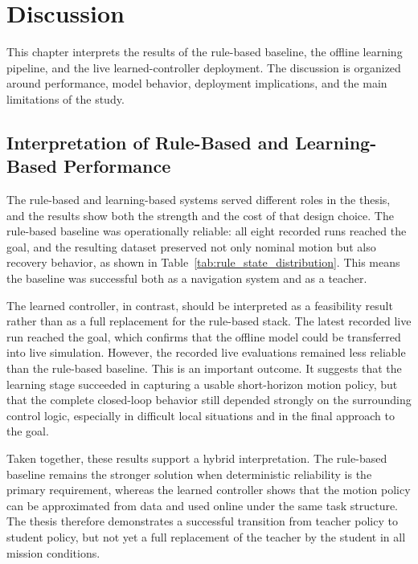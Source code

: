 
\chapter{Discussion}
\label{ch:discussion}

This chapter interprets the results of the rule-based baseline, the offline learning pipeline, and the live learned-controller deployment. The discussion is organized around performance, model behavior, deployment implications, and the main limitations of the study.

\section{Interpretation of Rule-Based and Learning-Based Performance}

The rule-based and learning-based systems served different roles in the thesis, and the results show both the strength and the cost of that design choice. The rule-based baseline was operationally reliable: all eight recorded runs reached the goal, and the resulting dataset preserved not only nominal motion but also recovery behavior, as shown in Table~\ref{tab:rule_state_distribution}. This means the baseline was successful both as a navigation system and as a teacher.

The learned controller, in contrast, should be interpreted as a feasibility result rather than as a full replacement for the rule-based stack. The latest recorded live run reached the goal, which confirms that the offline model could be transferred into live simulation. However, the recorded live evaluations remained less reliable than the rule-based baseline. This is an important outcome. It suggests that the learning stage succeeded in capturing a usable short-horizon motion policy, but that the complete closed-loop behavior still depended strongly on the surrounding control logic, especially in difficult local situations and in the final approach to the goal.

Taken together, these results support a hybrid interpretation. The rule-based baseline remains the stronger solution when deterministic reliability is the primary requirement, whereas the learned controller shows that the motion policy can be approximated from data and used online under the same task structure. The thesis therefore demonstrates a successful transition from teacher policy to student policy, but not yet a full replacement of the teacher by the student in all mission conditions.

